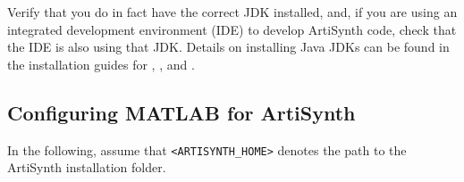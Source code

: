 \documentclass{article}
\begin{document}
Verify that you do in fact have the correct JDK installed, and, if you are
using an integrated development environment (IDE) to develop ArtiSynth code,
check that the IDE is also using that JDK.  Details on installing Java JDKs can
be found in the installation guides for
,
, and
.

\subsection{Configuring MATLAB for ArtiSynth}

In the following, assume that {\tt <ARTISYNTH\_HOME>} denotes the path
to the ArtiSynth installation folder.
\end{document}
